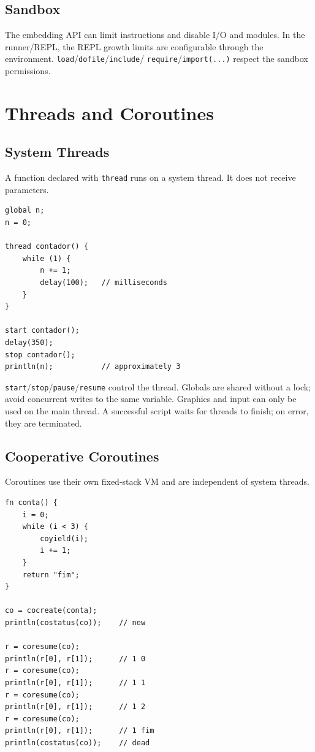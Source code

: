 \documentclass[11pt,a4paper,oneside]{report}
\newcommand{\code}[1]{\texttt{#1}}
\begin{document}
\section{Sandbox}
The embedding API can limit instructions and disable I/O and modules. In
the runner/REPL, the REPL growth limits are configurable through the
environment. \code{load}/\code{dofile}/\code{include}/
\code{require}/\code{import(...)} respect the sandbox permissions.

\chapter{Threads and Coroutines}
\label{cap:concorrencia}

\section{System Threads}
A function declared with \code{thread} runs on a system thread. It does
not receive parameters.

\begin{lstlisting}
global n;
n = 0;

thread contador() {
    while (1) {
        n += 1;
        delay(100);   // milliseconds
    }
}

start contador();
delay(350);
stop contador();
println(n);           // approximately 3
\end{lstlisting}

\code{start}/\code{stop}/\code{pause}/\code{resume} control the thread.
Globals are shared without a lock; avoid concurrent writes to the same
variable. Graphics and input can only be used on the main thread. A
successful script waits for threads to finish; on error, they are
terminated.

\section{Cooperative Coroutines}
Coroutines use their own fixed-stack VM and are independent of system
threads.

\begin{lstlisting}
fn conta() {
    i = 0;
    while (i < 3) {
        coyield(i);
        i += 1;
    }
    return "fim";
}

co = cocreate(conta);
println(costatus(co));    // new

r = coresume(co);
println(r[0], r[1]);      // 1 0
r = coresume(co);
println(r[0], r[1]);      // 1 1
r = coresume(co);
println(r[0], r[1]);      // 1 2
r = coresume(co);
println(r[0], r[1]);      // 1 fim
println(costatus(co));    // dead
\end{lstlisting}
\end{document}
